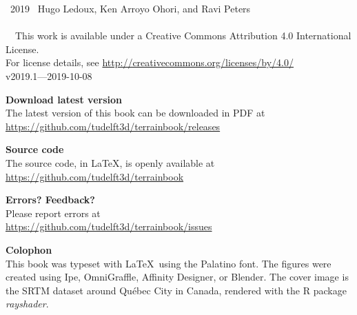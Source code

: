 
\clearpage
\thispagestyle{empty}
\null%
\vfill


\textcopyright\ 2019 \, Hugo Ledoux, Ken Arroyo Ohori, and Ravi Peters
\\ \\
\ccLogo\ \ccAttribution\ This work is available under a Creative Commons Attribution 4.0 International License.
\\For license details, see \url{http://creativecommons.org/licenses/by/4.0/}
\\


v2019.1---2019-10-08


\textbf{Download latest version} \\
The latest version of this book can be downloaded in PDF at\\ 
\url{https://github.com/tudelft3d/terrainbook/releases}


\textbf{Source code} \\
The source code, in \LaTeX, is openly available at\\
\url{https://github.com/tudelft3d/terrainbook}


\textbf{Errors? Feedback?} \\
Please report errors at\\
\url{https://github.com/tudelft3d/terrainbook/issues}

\textbf{Colophon} \\
This book was typeset with \LaTeX\ using the Palatino font.
The figures were created using Ipe, OmniGraffle, Affinity Designer, or Blender.
The cover image is the SRTM dataset around Québec City in Canada, rendered with the R package \emph{rayshader}.
